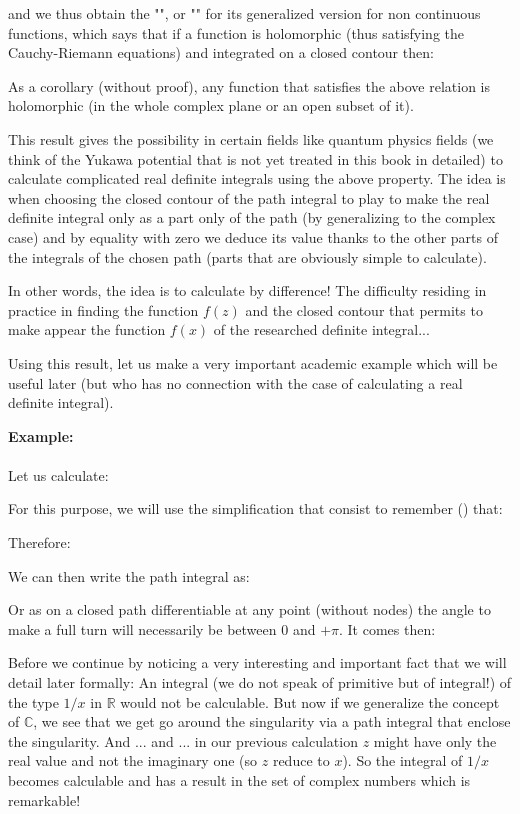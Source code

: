	and we thus obtain the "", or "" for its generalized version for non continuous functions, which says that if a function is holomorphic (thus satisfying the Cauchy-Riemann equations) and integrated on a closed contour then:
	
	As a corollary (without proof), any function that satisfies the above relation is holomorphic (in the whole complex plane or an open subset of it).
	
	This result gives the possibility in certain fields like quantum physics fields (we think of the Yukawa potential that is not yet treated in this book in detailed) to calculate complicated real definite integrals using the above property. The idea is when choosing the closed contour of the path integral to play to make the real definite integral only as a part only of the path (by generalizing to the complex case) and by equality with zero we deduce its value thanks to the other parts of the integrals of the chosen path (parts that are obviously simple to calculate).
	
	In other words, the idea is to calculate by difference! The difficulty residing in practice in finding the function $f (z)$ and the closed contour that permits to make appear the function $f (x) $ of the researched definite integral...
	
	Using this result, let us make a very important academic example which will be useful later (but who has no connection with the case of calculating a real definite integral).
	\begin{tcolorbox}[colframe=black,colback=white,sharp corners]
	\textbf{{\Large {}}Example:}\\\\
	Let us calculate:
	
	For this purpose, we will use the simplification that consist to remember () that:
	
	Therefore:
	
	We can then write the path integral as:
	
	Or as on a closed path differentiable at any point (without nodes) the angle to make a full turn will necessarily be between $0$ and $+\pi$. It comes then:
	
	\end{tcolorbox}
	Before we continue by noticing a very interesting and important fact that we will detail later formally: An integral (we do not speak of primitive but of integral!) of the type $1/x$ in $\mathbb{R}$ would not be calculable. But now if we generalize the concept of $\mathbb{C}$, we see that we get go around the singularity via a path integral that enclose the singularity. And ... and ... in our previous calculation $z$ might have only the real value and not the imaginary one (so $z$ reduce to $x$). So the integral of $1/x$ becomes calculable and has a result in the set of complex numbers which is remarkable!
	
